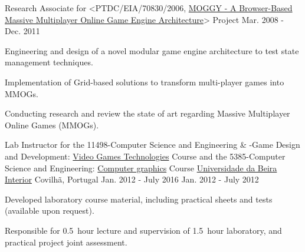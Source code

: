 \begin{cventries}
  \cventry
    {Research Associate for <PTDC/EIA/70830/2006, \href{http://www.di.ubi.pt/~agomes/moggy/index.html}{MOGGY - A Browser-Based Massive Multiplayer Online Game Engine Architecture}> Project} %
    {} %
    {} %
    {Mar. 2008 - Dec. 2011} %
    {
      \begin{cvitems} %
		\item {Engineering and design of a novel modular game engine architecture to test state management techniques.}
        \item {Implementation of Grid-based solutions to transform multi-player games into MMOGs.}
        \item {Conducting research and review the state of art regarding Massive Multiplayer Online Games (MMOGs).}
      \end{cvitems}
    }     
    
  \cventry
    {Lab Instructor for the
        11498-Computer Science and Engineering \& -Game Design and Development: 
		\href{http://www.di.ubi.pt/~agomes/tjv/}{Video Games Technologies}	Course 
		\linebreak and the
		5385-Computer Science and Engineering: 		
		\href{http://www.di.ubi.pt/~agomes/cg/}{Computer graphics} Course} %
    {\href{http://www.ubi.pt}{Universidade da Beira Interior}} %
    {Covilh\~a, Portugal} %
    {\linebreak Jan. 2012 - July 2016 \linebreak Jan. 2012 - July 2012} %
    {
      \begin{cvitems} %
		\item {Developed laboratory course material, including practical sheets and tests (available upon request).}
        \item {Responsible for 0.5~hour lecture and supervision of 1.5~hour laboratory, and practical project joint assessment.}%
      \end{cvitems}
    }       
    

\end{cventries}

